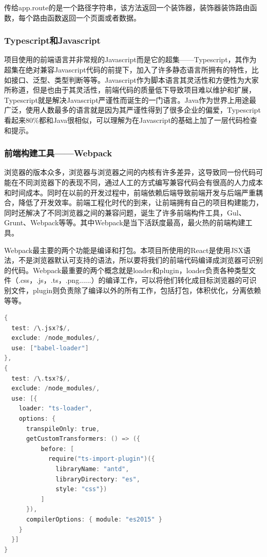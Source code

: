 传给app.route的是一个路径字符串，该方法返回一个装饰器，装饰器装饰路由函数，每个路由函数返回一个页面或者数据。

\subsubsection{Typescript和Javascript}

项目使用的前端语言并非常规的Javascript而是它的超集——Typescript，其作为超集在绝对兼容Javascript代码的前提下，加入了许多静态语言所拥有的特性，比如接口、泛型、类型判断等等。Javascript作为脚本语言其灵活性和方便性为大家所称道，但是也由于其灵活性，前端代码的质量低下导致项目难以维护和扩展，Typescript就是解决Javascript严谨性而诞生的一门语言。Java作为世界上用途最广泛，使用人数最多的语言就是因为其严谨性得到了很多企业的偏爱，Typescript看起来80\%都和Java很相似，可以理解为在Javascript的基础上加了一层代码检查和提示。

\subsubsection{前端构建工具——Webpack}

浏览器的版本众多，浏览器与浏览器之间的内核有许多差异，这导致同一份代码可能在不同浏览器下的表现不同，通过人工的方式编写兼容代码会有很高的人力成本和时间成本。同时在以前的开发过程中，前端依赖后端导致前端开发与后端严重耦合，降低了开发效率。前端工程化时代的到来，让前端拥有自己的项目构建能力，同时还解决了不同浏览器之间的兼容问题，诞生了许多前端构件工具，Gul、Grunt、Webpack等等。其中Webpack是当下活跃度最高，最火热的前端构建工具。

Webpack最主要的两个功能是编译和打包。本项目所使用的React是使用JSX语法，不是浏览器默认可支持的语法，所以要将我们的前端代码编译成浏览器可识别的代码。Webpack最重要的两个概念就是loader和plugin，loader负责各种类型文件（.css，.js，.ts，.png......）的编译工作，可以将他们转化成目标浏览器的可识别文件，plugin则负责除了编译以外的所有工作，包括打包，体积优化，分离依赖等等。

\begin{lstlisting}[language=C]
{
  test: /\.jsx?$/,
  exclude: /node_modules/,
  use: ["babel-loader"]
},
{
  test: /\.tsx?$/,
  exclude: /node_modules/,
  use: [{
    loader: "ts-loader",
    options: {
      transpileOnly: true,
      getCustomTransformers: () => ({
          before: [
            require("ts-import-plugin")({
              libraryName: "antd",
              libraryDirectory: "es",
              style: "css"})
          ]
      }),
      compilerOptions: { module: "es2015" }
    }
  }]
}
\end{lstlisting}

